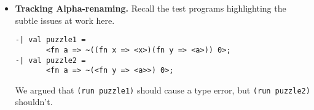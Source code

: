\documentclass{sigplanconf}
\newcommand{\om}{$\Omega$mega}
\begin{document}
\begin{itemize}
How does this program hold up in our \om{} encoding?
\begin{verbatim}
|- Br (Abs `x (Esc (Run (Br (V `x)))))
Error: Br (V `x) isn't polymorphic enough
Expected type: forall v. 
               Exp a u (Rec v,b) 
                       (Cd v b c) 
   Found type: Exp a u (Rec {`x:c; w},b) 
                       (Cd {`x:c; w} b c))
\end{verbatim}

The program is rejected because the term \verb+(Br (V `x))+
isn't polymorphic enough. The term has the type
\begin{verbatim}
Exp a u (Rec {`x:b; v},c) (Cd {`x:b; v} c b)
\end{verbatim}
See how the variable \verb+x+ shows up in the current context of
the code type. Run can be applied only to code whose
current context is completely polymorphic.

\vspace*{.1in}
\item{\bf Tracking Alpha-renaming.} 
Recall the test programs highlighting the subtle issues at work here.
\begin{verbatim}
-| val puzzle1 = 
       <fn a => ~((fn x => <x>)(fn y => <a>)) 0>;
-| val puzzle2 = 
       <fn a => ~(<fn y => <a>>) 0>;
\end{verbatim}
We argued that \verb|(run puzzle1)| should cause a type error, but \verb|(run puzzle2)| 
shouldn't.


\end{itemize}
\end{document}
